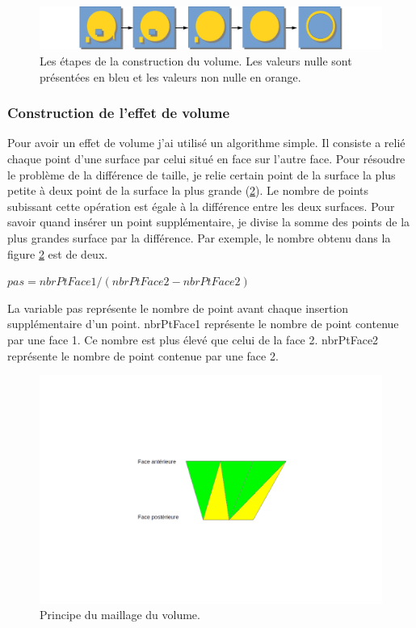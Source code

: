 \documentclass[a4paper,12pt]{article}
\begin{document}
\begin{figure}[h]
	\centering
	\includegraphics[width=18cm,trim=5cm 0cm 3cm 0cm, clip ]{contour.png}  
	\caption{Les étapes de la construction du volume. Les valeurs nulle sont présentées en bleu et les valeurs non nulle en orange. }
	\label{fig:lissage}
\end{figure} 

		\subsubsection{Construction de l'effet de volume}
	Pour avoir un effet de volume j'ai utilisé un algorithme simple. Il consiste a relié chaque point d'une surface par celui situé en face sur l'autre face. Pour résoudre le problème de la différence de taille, je relie certain point de la surface la plus petite à deux point de la surface la plus grande (\ref{fig:volumeMaillage}). Le nombre de points subissant cette opération est égale à la différence entre les deux surfaces. Pour savoir quand insérer un point supplémentaire, je divise la somme des points de la plus grandes surface par la différence. Par exemple, le nombre obtenu dans la figure \ref{fig:volumeMaillage} est de deux.

\vspace{0.25cm}
$  pas = nbrPtFace1 /(nbrPtFace2 - nbrPtFace2)$

\vspace{0.25cm}
La variable pas représente le nombre de point avant chaque insertion supplémentaire d'un point. nbrPtFace1 représente le nombre de point contenue par une face 1. Ce nombre est plus élevé que celui de la face 2. nbrPtFace2 représente le nombre de point contenue par une face 2.


\begin{figure}[h]
	\centering
\includegraphics[width=15cm,trim=10cm 10cm 10cm 10cm, clip ]{volumeSchema.png} 
	\caption{Principe du maillage du volume.}
	\label{fig:volumeMaillage}
\end{figure} 
\end{document}
